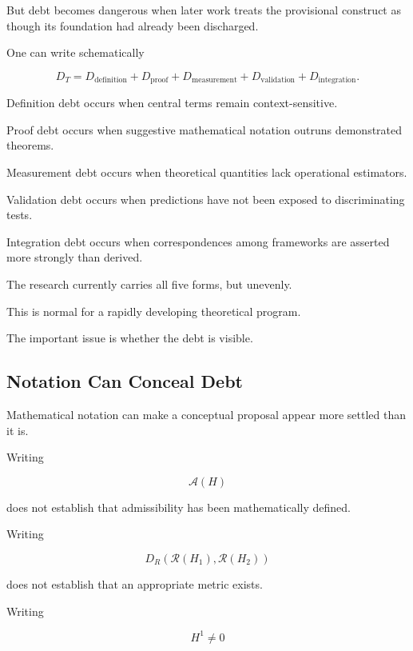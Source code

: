 \documentclass[11pt]{article}
\theoremstyle{remark}
\newcommand{\Adm}{\mathcal{A}}
\newcommand{\Reach}{\mathcal{R}}
\begin{document}
But debt becomes dangerous when later work treats the provisional construct as though its foundation had already been discharged.

One can write schematically

\begin{equation}
D_T
=
D_{\mathrm{definition}}
+
D_{\mathrm{proof}}
+
D_{\mathrm{measurement}}
+
D_{\mathrm{validation}}
+
D_{\mathrm{integration}}.
\end{equation}

Definition debt occurs when central terms remain context-sensitive.

Proof debt occurs when suggestive mathematical notation outruns demonstrated theorems.

Measurement debt occurs when theoretical quantities lack operational estimators.

Validation debt occurs when predictions have not been exposed to discriminating tests.

Integration debt occurs when correspondences among frameworks are asserted more strongly than derived.

The research currently carries all five forms, but unevenly.

This is normal for a rapidly developing theoretical program.

The important issue is whether the debt is visible.

\subsection{Notation Can Conceal Debt}

Mathematical notation can make a conceptual proposal appear more settled than it is.

Writing

\begin{equation}
\Adm(H)
\end{equation}

does not establish that admissibility has been mathematically defined.

Writing

\begin{equation}
D_R
(
\Reach(H_1),
\Reach(H_2)
)
\end{equation}

does not establish that an appropriate metric exists.

Writing

\begin{equation}
H^1\neq0
\end{equation}
\end{document}
